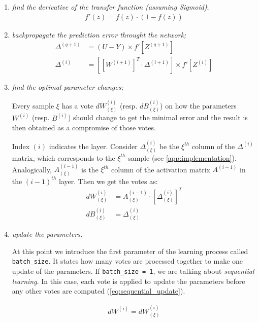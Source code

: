 \begin{enumerate}
\item \textit{find the derivative of the transfer function (assuming Sigmoid)};
\begin{align} \label{eq:transfer_function_der}
f'(z) = f(z) \cdot (1-f(z))
\end{align}
\item \textit{backpropagate the prediction error throught the network;}
\begin{align} \label{eq:error_backprop}
\Delta^{(q+1)} &= (U-Y) \times f'[Z^{(q+1)}] \\
\Delta^{(i)} &= \left[\left[W^{(i+1)}\right]^T \cdot \Delta^{(i+1)}\right] \times f'[Z^{(i)}]
\end{align}
\item \textit{find the optimal parameter changes;}

Every sample $ \xi $ has a vote $ dW^{(i)}_{(\xi)} $ (resp. $ dB^{(i)}_{(\xi)} $) on how the parameters $ W^{(i)} $ (resp. $ B^{(i)} $) should change to get the minimal error and the result is then obtained as a compromise of those votes.

Index $ (i) $ indicates the layer. Consider $ \Delta^{(i)}_{(\xi)} $ be the $ \xi^{th} $ column of the $ \Delta^{(i)} $ matrix, which corresponds to the $ \xi^{th} $ sample (see \cref{app:implementation}). Analogically, $ A^{(i-1)}_{(\xi)} $ is the $ \xi^{th} $ column of the activation matrix $ A^{(i-1)} $ in the $ (i-1)^{th} $ layer. Then we get the votes as:
\begin{align} \label{eq:part_derivative}
dW^{(i)}_{(\xi)} &= A^{(i-1)}_{(\xi)} \cdot \left[\Delta^{(i)}_{(\xi)}\right]^T\\
dB^{(i)}_{(\xi)} &= \Delta^{(i)}_{(\xi)}
\end{align}
\item \textit{update the parameters.}

At this point we introduce the first parameter of the learning process called \texttt{batch\_size}. It states how many votes are processed together to make one update of the parameters. If \texttt{batch\_size = 1}, we are talking about \textit{sequential learning}. In this case, each vote is applied to update the parameters before any other votes are computed (\cref{eq:sequential_update}). 

\begin{align} \label{eq:sequential_update}
dW^{(i)} = dW^{(i)}_{(\xi)}
\end{align}


\end{enumerate}
